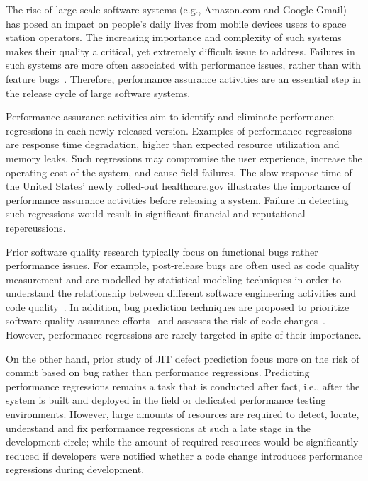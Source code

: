 
The rise of large-scale software systems (e.g., Amazon.com and Google Gmail) has posed an impact on people's daily lives from mobile devices users to space station operators. The increasing importance and complexity of such systems makes their quality a critical, yet extremely difficult issue to address. Failures in such systems are more often associated with performance issues, rather than with feature bugs~\cite{Weyuker:2000}. Therefore, performance assurance activities are an essential step in the release cycle of large software systems. 

Performance assurance activities aim to identify and eliminate performance regressions in each newly released version. Examples of performance regressions are response time degradation, higher than expected resource utilization and memory leaks. Such regressions may compromise the user experience, increase the operating cost of the system, and cause field failures. The slow response time of the United States' newly rolled-out healthcare.gov illustrates the importance of performance assurance activities before releasing a system. Failure in detecting such regressions would result in significant financial and reputational repercussions.

Prior software quality research typically focus on functional bugs rather performance issues. For example, post-release bugs are often used as code quality measurement and are modelled by statistical modeling techniques in order to understand the relationship between different software engineering activities and code quality~\cite{Hassan:2009:PFU}. In addition, bug prediction techniques are proposed to prioritize software quality assurance efforts~\cite{Zimmermann:2007:PDE,Nagappan:2005:URC,Nagappan:2006:MMP} and assesses the risk of code changes~\cite{emadjit}. However, performance regressions are rarely targeted in spite of their importance.

On the other hand, prior study of JIT defect prediction focus more on the risk of commit based on bug rather than performance regressions. Predicting performance regressions remains a task that is conducted after fact, i.e., after the system is built and deployed in the field or dedicated performance testing environments. However, large amounts of resources are required to detect, locate, understand and fix performance regressions at such a late stage in the development circle; while the amount of required resources would be significantly reduced if developers were notified whether a code change introduces performance regressions during development. 

